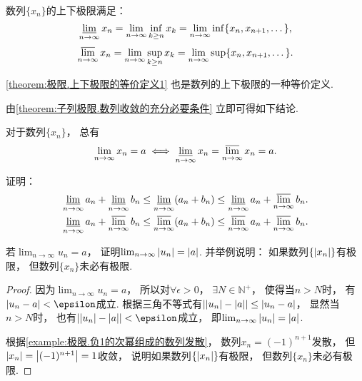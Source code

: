 \begin{theorem}\label{theorem:极限.上下极限的等价定义1}
数列\(\{x_n\}\)的上下极限满足：\[
	\varliminf_{n\to\infty} x_n
	= \lim_{n\to\infty} \inf_{k\geq n} x_k
	= \lim_{n\to\infty} \inf\{x_n,x_{n+1},\dotsc\},
\]\[
	\varlimsup_{n\to\infty} x_n
	= \lim_{n\to\infty} \sup_{k\geq n} x_k
	= \lim_{n\to\infty} \sup\{x_n,x_{n+1},\dotsc\}.
\]
\end{theorem}
\cref{theorem:极限.上下极限的等价定义1}
也是数列的上下极限的一种等价定义.

由\cref{theorem:子列极限.数列收敛的充分必要条件} 立即可得如下结论.
\begin{corollary}
对于数列\(\{x_n\}\)，
总有\[
	\lim_{n\to\infty} x_n = a
	\iff
	\varliminf_{n\to\infty} x_n
	= \varlimsup_{n\to\infty} x_n
	= a.
\]
\end{corollary}

\begin{example}
%
证明：\begin{gather}
	\varliminf_{n\to\infty} a_n
	+ \varliminf_{n\to\infty} b_n
	\leq \varliminf_{n\to\infty} (a_n + b_n)
	\leq \varliminf_{n\to\infty} a_n
	+ \varlimsup_{n\to\infty} b_n. \\
	\varliminf_{n\to\infty} a_n
	+ \varlimsup_{n\to\infty} b_n
	\leq \varlimsup_{n\to\infty} (a_n + b_n)
	\leq \varlimsup_{n\to\infty} a_n
	+ \varlimsup_{n\to\infty} b_n.
\end{gather}
\end{example}

\begin{example}
若\(\lim_{n\to\infty} u_n = a\)，
证明\(\lim_{n\to\infty} \abs{u_n} = \abs{a}\).
并举例说明：
如果数列\(\{\abs{x_n}\}\)有极限，
但数列\(\{x_n\}\)未必有极限.
\begin{proof}
因为\(\lim_{n\to\infty} u_n = a\)，
所以对\(\forall\epsilon>0\)，
\(\exists N \in \mathbb{N}^+\)，
使得当\(n>N\)时，
有\(\abs{u_n-a}<\epsilon\)成立.
根据三角不等式有\(\abs{\abs{u_n}-\abs{a}} \leq \abs{u_n-a}\)，
显然当\(n>N\)时，
也有\(\abs{\abs{u_n}-\abs{a}}<\epsilon\)成立，
即\(\lim_{n\to\infty} \abs{u_n} = \abs{a}\).

根据\cref{example:极限.负1的次幂组成的数列发散}，
数列\(x_n = (-1)^{n+1}\)发散，
但\(\abs{x_n} = \abs{(-1)^{n+1}} = 1\)收敛，
说明如果数列\(\{\abs{x_n}\}\)有极限，
但数列\(\{x_n\}\)未必有极限.
\end{proof}
\end{example}

